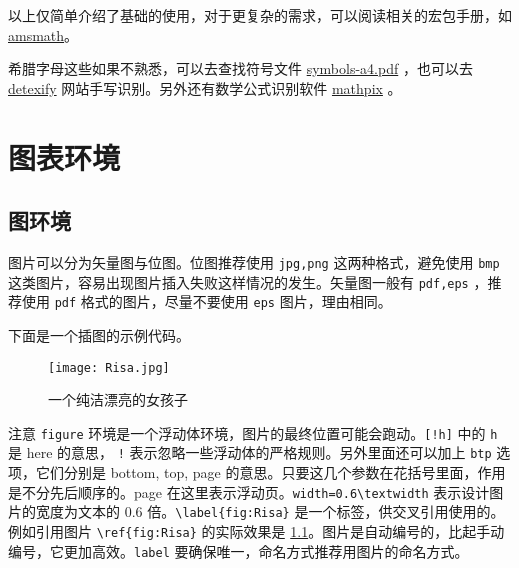 以上仅简单介绍了基础的使用，对于更复杂的需求，可以阅读相关的宏包手册，如 \href{http://texdoc.net/texmf-dist/doc/latex/amsmath/amsldoc.pdf}{amsmath}。

希腊字母这些如果不熟悉，可以去查找符号文件 \href{http://mirrors.ctan.org/info/symbols/comprehensive/symbols-a4.pdf}{symbols-a4.pdf} ，也可以去 \href{http://detexify.kirelabs.org/classify.html}{detexify} 网站手写识别。另外还有数学公式识别软件 \href{https://mathpix.com/}{mathpix} 。


\chapter{图表环境}

\section{图环境}
图片可以分为矢量图与位图。位图推荐使用 \verb|jpg,png| 这两种格式，避免使用 \verb|bmp| 这类图片，容易出现图片插入失败这样情况的发生。矢量图一般有 \verb|pdf,eps| ，推荐使用 \verb|pdf|  格式的图片，尽量不要使用 \verb|eps| 图片，理由相同。

下面是一个插图的示例代码。
\begin{figure}[!htb]
  \centering
  \texttt{[image: Risa.jpg]}
  \caption{一个纯洁漂亮的女孩子}
  \label{fig:Risa}
\end{figure}
注意 \verb|figure| 环境是一个浮动体环境，图片的最终位置可能会跑动。\verb|[!h]| 中的 \verb|h| 是 here 的意思， \verb|!| 表示忽略一些浮动体的严格规则。另外里面还可以加上 \verb|btp| 选项，它们分别是 bottom, top, page 的意思。只要这几个参数在花括号里面，作用是不分先后顺序的。page 在这里表示浮动页。\verb|width=0.6\textwidth| 表示设计图片的宽度为文本的 0.6 倍。\verb|\label{fig:Risa}| 是一个标签，供交叉引用使用的。例如引用图片 \verb|\ref{fig:Risa}| 的实际效果是 \ref{fig:Risa}。图片是自动编号的，比起手动编号，它更加高效。\verb|label| 要确保唯一，命名方式推荐用图片的命名方式。

